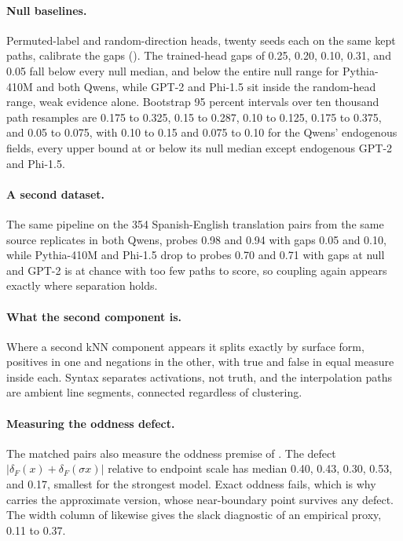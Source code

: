 \documentclass[mlmain,onecolumn]{jmlr}
\newcommand{\dF}{\delta_{\!F}}
\begin{document}
\paragraph{Null baselines.}
Permuted-label and random-direction heads, twenty seeds each on
the same kept paths, calibrate the gaps
(). The trained-head gaps of 0.25, 0.20,
0.10, 0.31, and 0.05 fall below every null median, and below the
entire null range for Pythia-410M and both Qwens, while GPT-2 and
Phi-1.5 sit inside the random-head range, weak evidence alone.
Bootstrap 95 percent intervals over ten thousand path resamples are
0.175 to 0.325, 0.15 to 0.287, 0.10 to 0.125, 0.175 to 0.375, and
0.05 to 0.075, with 0.10 to 0.15 and 0.075 to 0.10 for the Qwens'
endogenous fields, every upper bound at or below its null median except
endogenous GPT-2 and Phi-1.5.

\paragraph{A second dataset.}
The same pipeline on the 354 Spanish-English translation pairs from
the same source replicates in both Qwens, probes 0.98 and 0.94 with
gaps 0.05 and 0.10, while Pythia-410M and Phi-1.5 drop to probes
0.70 and 0.71 with gaps at null and GPT-2 is at chance with too few
paths to score, so coupling again appears exactly where separation
holds.

\paragraph{What the second component is.}
Where a second kNN component appears it splits exactly by surface
form, positives in one and negations in the other, with true and
false in equal measure inside each. Syntax separates activations,
not truth, and the interpolation paths are ambient line segments,
connected regardless of clustering.

\paragraph{Measuring the oddness defect.}
The matched pairs also measure the oddness premise of
. The defect $|\dF(x) + \dF(\sigma x)|$
relative to endpoint scale has median 0.40, 0.43, 0.30, 0.53, and
0.17, smallest for the strongest model. Exact oddness fails, which
is why  carries the approximate
version, whose near-boundary point survives any defect. The width
column of  likewise gives the slack
diagnostic of  an empirical proxy, 0.11
to 0.37.
\end{document}

